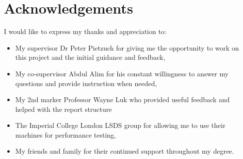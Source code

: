 \documentclass[final_report.tex]{subfiles}
\begin{document}
\section*{Acknowledgements}
\thispagestyle{empty}
I would like to express my thanks and appreciation to:

\begin{itemize}
	\item My supervisor Dr Peter Pietzuch for giving me the opportunity to work on this project and the initial guidance and feedback,
	\item My co-supervisor Abdul Alim for his constant willingness to answer my questions and provide instruction when needed,
	\item My 2nd marker Professor Wayne Luk who provided useful feedback and helped with the report structure
	\item The Imperial College London LSDS group for allowing me to use their machines for performance testing,
	\item My friends and family for their continued support throughout my degree.
\end{itemize}

\clearpage
\end{document}
